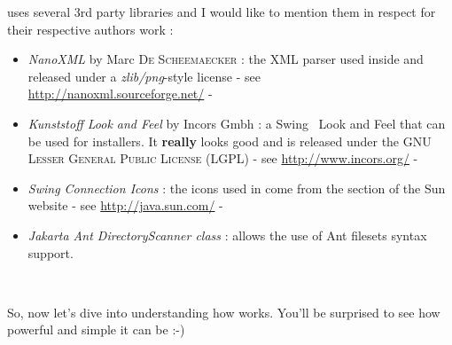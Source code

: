 \IzPack uses several 3rd party libraries and I would like to mention them in
respect for their respective authors work :
\begin{itemize}
  \item \textit{NanoXML} by Marc \textsc{De Scheemaecker} : the XML parser used
  inside \IzPack and released under a \textit{zlib/png}-style license - see\\
  \url{http://nanoxml.sourceforge.net/} -
  \item \textit{Kunststoff Look and Feel} by Incors Gmbh : a Swing\texttrademark 
  \ Look and Feel
  that can be used for installers. It \textbf{really} looks good and
  is released under the \textsc{GNU Lesser General Public License (LGPL)} - see
  \url{http://www.incors.org/} -
  \item \textit{Swing Connection Icons} : the icons used in \IzPack come from
  the \Java section of the Sun website - see \url{http://java.sun.com/} -
  \item \textit{Jakarta Ant DirectoryScanner class} : allows the use of Ant
  filesets syntax support. 
\end{itemize}\

So, now let's dive into understanding how \IzPack works. You'll be
surprised to see how powerful and simple it can be :-)
